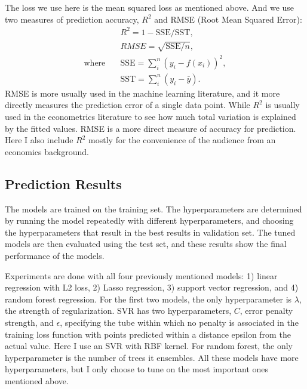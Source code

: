 \documentclass[a4paper]{article}
\begin{document}
The loss we use here is the mean squared loss as mentioned above. And we use two measures of prediction accuracy, $R^2$ and RMSE (Root Mean Squared Error):
\begin{align}
& R^2 = 1 - \text{SSE}/ \text{SST}, \\
& RMSE = \sqrt{\text{SSE} / n}, \\
\text{where} \quad & \text{SSE} = \sum_i^n (y_i - f(x_i))^2, \\
 & \text{SST} = \sum_i^n (y_i - \bar{y}).
\end{align}
RMSE is more usually used in the machine learning literature, and it more directly measures the prediction error of a single data point. While $R^2$ is usually used in the econometrics literature to see how much total variation is explained by the fitted values. RMSE is a more direct measure of accuracy for prediction. Here I also include $R^2$ mostly for the convenience of the audience from an economics background.

\subsection{Prediction Results}
The models are trained on the training set. The hyperparameters are determined by running the model repeatedly with different hyperparameters, and choosing the hyperparameters that result in the best results in validation set. The tuned models are then evaluated using the test set, and these results show the final performance of the models.

Experiments are done with all four previously mentioned models: 1) linear regression with L2 loss, 2) Lasso regression, 3) support vector regression, and 4) random forest regression. For the first two models, the only hyperparameter is $\lambda$, the strength of regularization. SVR has two hyperparameters, $C$, error penalty strength, and $\epsilon$, specifying the tube within which no penalty is associated in the training loss function with points predicted within a distance epsilon from the actual value. Here I use an SVR with RBF kernel. For random forest, the only hyperparameter is the number of trees it ensembles. All these models have more hyperparameters, but I only choose to tune on the most important ones mentioned above.
\end{document}
